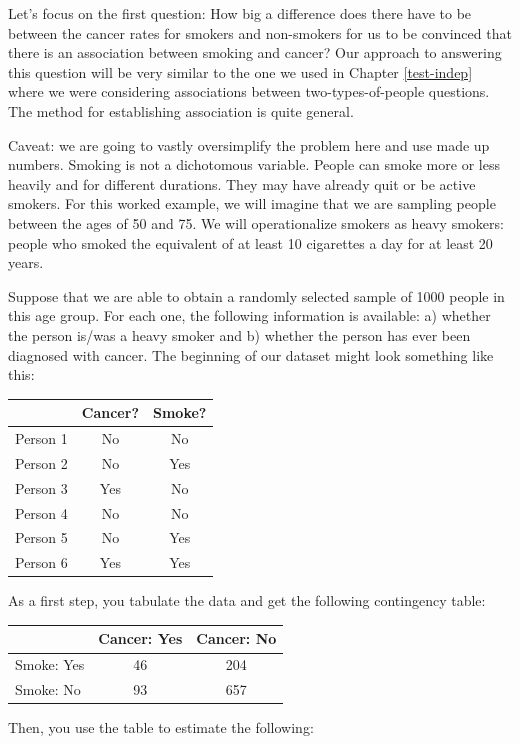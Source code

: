 \documentclass[
  openany]{book}
\begin{document}
Let's focus on the first question: How big a difference does there have to be between the cancer rates for smokers and non-smokers for us to be convinced that there is an association between smoking and cancer? Our approach to answering this question will be very similar to the one we used in Chapter \ref{test-indep} where we were considering associations between two-types-of-people questions. The method for establishing association is quite general.

Caveat: we are going to vastly oversimplify the problem here and use made up numbers. Smoking is not a dichotomous variable. People can smoke more or less heavily and for different durations. They may have already quit or be active smokers. For this worked example, we will imagine that we are sampling people between the ages of 50 and 75. We will operationalize smokers as heavy smokers: people who smoked the equivalent of at least 10 cigarettes a day for at least 20 years.

Suppose that we are able to obtain a randomly selected sample of 1000 people in this age group. For each one, the following information is available: a) whether the person is/was a heavy smoker and b) whether the person has ever been diagnosed with cancer. The beginning of our dataset might look something like this:

\begin{longtable}[]{@{}lcc@{}}
\toprule
& Cancer? & Smoke? \\
\midrule
\endhead
Person 1 & No & No \\
Person 2 & No & Yes \\
Person 3 & Yes & No \\
Person 4 & No & No \\
Person 5 & No & Yes \\
Person 6 & Yes & Yes \\
\bottomrule
\end{longtable}

As a first step, you tabulate the data and get the following contingency table:

\begin{longtable}[]{@{}lcc@{}}
\toprule
& Cancer: Yes & Cancer: No \\
\midrule
\endhead
Smoke: Yes & 46 & 204 \\
Smoke: No & 93 & 657 \\
\bottomrule
\end{longtable}

Then, you use the table to estimate the following:
\end{document}
